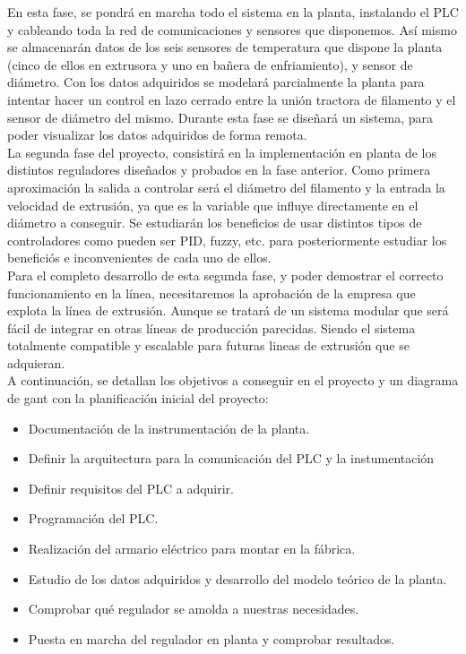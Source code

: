 En esta fase, se pondrá en marcha todo el sistema en la planta, instalando el PLC y cableando toda la red de comunicaciones y sensores que disponemos. Así mismo se almacenarán datos de los seis sensores de temperatura que dispone la planta (cinco de ellos en extrusora y uno en bañera de enfriamiento), y sensor de diámetro. Con los datos adquiridos se modelará parcialmente la planta para intentar hacer un control en lazo cerrado entre la unión tractora de filamento y el sensor de diámetro del mismo. Durante esta fase se diseñará un sistema, para poder visualizar los datos adquiridos de forma remota.\\

La segunda fase del proyecto, consistirá en la implementación en planta de los distintos reguladores diseñados y probados en la fase anterior. Como primera aproximación la salida a controlar será el diámetro del filamento y la entrada la velocidad de extrusión, ya que es la variable que influye directamente en el diámetro a conseguir. Se estudiarán los beneficios de usar distintos tipos de controladores como pueden ser PID, fuzzy, etc. para posteriormente estudiar los beneficiós e inconvenientes de cada uno de ellos.\\

Para el completo desarrollo de esta segunda fase, y poder demostrar el correcto funcionamiento en la línea, necesitaremos la aprobación de la empresa que explota la línea de extrusión. Aunque se tratará de un sistema modular que será fácil de integrar en otras líneas de producción parecidas. Siendo el sistema totalmente compatible y escalable para futuras lineas de extrusión que se adquieran.\\

A continuación, se detallan los objetivos a conseguir en el proyecto y un diagrama de gant con la planificación inicial del proyecto:

\begin{itemize}
	\item Documentación de la instrumentación de la planta.
	\item Definir la arquitectura para la comunicación del PLC y la instumentación
	\item Definir requisitos del PLC a adquirir.
	\item Programación del PLC.
	\item Realización del armario eléctrico para montar en la fábrica.
	\item Estudio de los datos adquiridos y desarrollo del modelo teórico de la planta.
	\item Comprobar qué regulador se amolda a nuestras necesidades.
	\item Puesta en marcha del regulador en planta y comprobar resultados.
\end{itemize}


